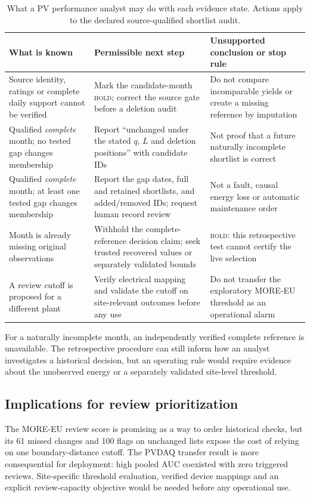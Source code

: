 \documentclass[preprint,12pt]{elsarticle}
\begin{document}
\begin{table}[H]
\centering
\caption{What a PV performance analyst may do with each evidence state. Actions apply to the declared source-qualified shortlist audit.}
\label{tab:practical}
\footnotesize
\setlength{\tabcolsep}{4.2pt}
\renewcommand{\arraystretch}{1.14}
\begin{tabular}{@{}L{3.15cm}L{4.75cm}L{4.55cm}@{}}
\toprule
What is known & Permissible next step & Unsupported conclusion or stop rule \\
\midrule
Source identity, ratings or complete daily support cannot be verified & Mark the candidate-month \textsc{hold}; correct the source gate before a deletion audit & Do not compare incomparable yields or create a missing reference by imputation \\
Qualified \emph{complete} month; no tested gap changes membership & Report ``unchanged under the stated $q$, $L$ and deletion positions'' with candidate IDs & Not proof that a future naturally incomplete shortlist is correct \\
Qualified \emph{complete} month; at least one tested gap changes membership & Report the gap dates, full and retained shortlists, and added/removed IDs; request human record review & Not a fault, causal energy loss or automatic maintenance order \\
Month is already missing original observations & Withhold the complete-reference decision claim; seek trusted recovered values or separately validated bounds & \textsc{hold}: this retrospective test cannot certify the live selection \\
A review cutoff is proposed for a different plant & Verify electrical mapping and validate the cutoff on site-relevant outcomes before any use & Do not transfer the exploratory MORE-EU threshold as an operational alarm \\
\bottomrule
\end{tabular}
\end{table}

For a naturally incomplete month, an independently verified complete reference is unavailable. The retrospective procedure can still inform how an analyst investigates a historical decision, but an operating rule would require evidence about the unobserved energy or a separately validated site-level threshold.

\subsection{Implications for review prioritization}
The MORE-EU review score is promising as a way to order historical checks, but its 61 missed changes and 100 flags on unchanged lists expose the cost of relying on one boundary-distance cutoff. The PVDAQ transfer result is more consequential for deployment: high pooled AUC coexisted with zero triggered reviews. Site-specific threshold evaluation, verified device mappings and an explicit review-capacity objective would be needed before any operational use.
\end{document}
